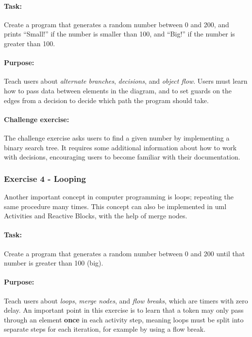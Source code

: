 \paragraph{Task:} Create a program that generates a random number between 0 and 200, and prints ``Small!'' if the number is smaller than 100, and ``Big!'' if the number is greater than 100.

\paragraph{Purpose:} Teach users about \emph{alternate branches}, \emph{decisions}, and \emph{object flow}. Users must learn how to pass data between elements in the diagram, and to set guards on the edges from a decision to decide which path the program should take.

\paragraph{Challenge exercise:} The challenge exercise asks users to find a given number by implementing a binary search tree. It requires some additional information about how to work with decisions, encouraging users to become familiar with their documentation.

\subsubsection{Exercise 4 - Looping}
Another important concept in computer programming is loops; repeating the same procedure many times. This concept can also be implemented in \gls{uml} Activities and Reactive Blocks, with the help of merge nodes.

\paragraph{Task:} Create a program that generates a random number between 0 and 200 until that number is greater than 100 (big).

\paragraph{Purpose:} Teach users about \emph{loops}, \emph{merge nodes}, and \emph{flow breaks}, which are timers with zero delay. An important point in this exercise is to learn that a token may only pass through an element \textbf{once} in each activity step, meaning loops must be split into separate steps for each iteration, for example by using a flow break.

